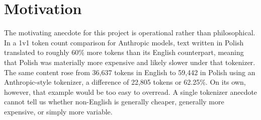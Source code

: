 \documentclass[11pt]{article}
\begin{document}
\section{Motivation}

The motivating anecdote for this project is operational rather than philosophical. In a 1v1 token count comparison for Anthropic models, text written in Polish translated to roughly 60\% more tokens than its English counterpart, meaning that Polish was materially more expensive and likely slower under that tokenizer. The same content rose from 36{,}637 tokens in English to 59{,}442 in Polish using an Anthropic-style tokenizer, a difference of 22{,}805 tokens or 62.25\%. On its own, however, that example would be too easy to overread. A single tokenizer anecdote cannot tell us whether non-English is generally cheaper, generally more expensive, or simply more variable.
\end{document}
